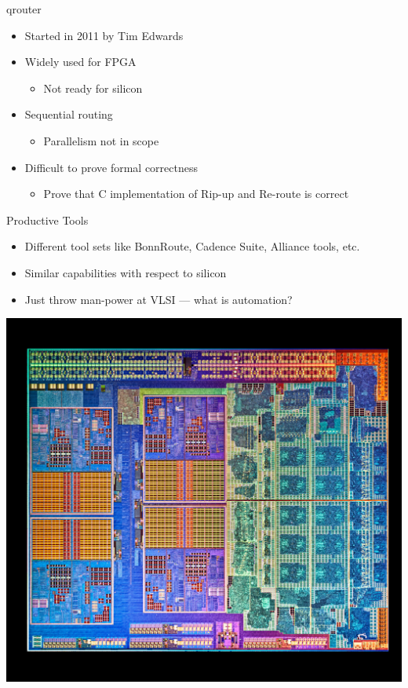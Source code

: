 \documentclass[aspectratio=169]{beamer}
\begin{document}
\begin{frame}{qrouter}
	\begin{itemize}
        \setlength\itemsep{1em}
		\item Started in 2011 by Tim Edwards 
		\item Widely used for FPGA
	        \begin{itemize}
		    \item Not ready for silicon
	        \end{itemize}
		\item Sequential routing
	        \begin{itemize}
		    \item Parallelism not in scope
	        \end{itemize}
		\item Difficult to prove formal correctness
	        \begin{itemize}
		    \item Prove that C implementation of Rip-up and Re-route is correct
	        \end{itemize}
	\end{itemize}
\end{frame}

\begin{frame}{Productive Tools}
	\begin{itemize}
        \setlength\itemsep{1em}
		\item Different tool sets like BonnRoute, Cadence Suite, Alliance tools, etc.
		\item Similar capabilities with respect to silicon
		\item Just throw man-power at VLSI --- what is automation?
	\end{itemize}
\end{frame}

{
\begin{frame}
    \begin{center}
        \includegraphics[height=\textheight]{images/VLSI01_rotated.jpg}
    \end{center}
\end{frame} 
}
\end{document}
